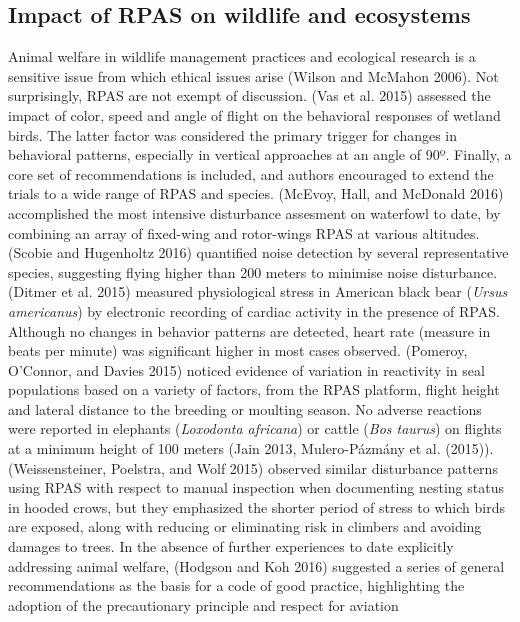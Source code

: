 \documentclass[]{interact}
\theoremstyle{plain}%
\theoremstyle{definition}
\theoremstyle{remark}
\begin{document}
\subsection{Impact of RPAS on wildlife and
ecosystems}\label{impact-of-rpas-on-wildlife-and-ecosystems}

Animal welfare in wildlife management practices and ecological research
is a sensitive issue from which ethical issues arise (Wilson and McMahon
2006). Not surprisingly, RPAS are not exempt of discussion. (Vas et al.
2015) assessed the impact of color, speed and angle of flight on the
behavioral responses of wetland birds. The latter factor was considered
the primary trigger for changes in behavioral patterns, especially in
vertical approaches at an angle of 90º. Finally, a core set of
recommendations is included, and authors encouraged to extend the trials
to a wide range of RPAS and species. (McEvoy, Hall, and McDonald 2016)
accomplished the most intensive disturbance assesment on waterfowl to
date, by combining an array of fixed-wing and rotor-wings RPAS at
various altitudes. (Scobie and Hugenholtz 2016) quantified noise
detection by several representative species, suggesting flying higher
than 200 meters to minimise noise disturbance. (Ditmer et al. 2015)
measured physiological stress in American black bear (\emph{Ursus
americanus}) by electronic recording of cardiac activity in the presence
of RPAS. Although no changes in behavior patterns are detected, heart
rate (measure in beats per minute) was significant higher in most cases
observed. (Pomeroy, O'Connor, and Davies 2015) noticed evidence of
variation in reactivity in seal populations based on a variety of
factors, from the RPAS platform, flight height and lateral distance to
the breeding or moulting season. No adverse reactions were reported in
elephants (\emph{Loxodonta africana}) or cattle (\emph{Bos taurus}) on
flights at a minimum height of 100 meters (Jain 2013, Mulero-Pázmány et
al. (2015)). (Weissensteiner, Poelstra, and Wolf 2015) observed similar
disturbance patterns using RPAS with respect to manual inspection when
documenting nesting status in hooded crows, but they emphasized the
shorter period of stress to which birds are exposed, along with reducing
or eliminating risk in climbers and avoiding damages to trees. In the
absence of further experiences to date explicitly addressing animal
welfare, (Hodgson and Koh 2016) suggested a series of general
recommendations as the basis for a code of good practice, highlighting
the adoption of the precautionary principle and respect for aviation
\end{document}
